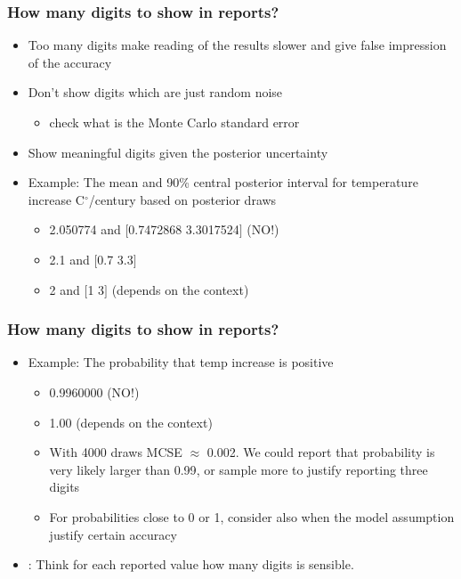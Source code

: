 \documentclass[10pt]{beamer}
\begin{document}
\begin{frame}

\frametitle{How many digits to show in reports?}


  \begin{itemize}
  \item Too many digits make reading of the results slower and give
    false impression of the accuracy
  \item<2-> Don't show digits which are just random noise
    \begin{itemize}
    \item check what is the Monte Carlo standard error
    \end{itemize}
  \item<3-> Show meaningful digits given the posterior uncertainty
  \item<4-> Example: The mean and 90\% central posterior interval for temperature
     increase C$^\circ$/century based on posterior draws
     \begin{itemize}
     \item<5-> {\color{red} 2.050774 and $[$0.7472868 3.3017524$]$} (NO!)
     \item<6-> {\color{uured} 2.1 and $[$0.7 3.3$]$}
    \item<7-> {\color{uured} 2 and $[$1 3$]$} (depends on the context)
     \end{itemize}
  \end{itemize}

\end{frame}


\begin{frame}

\frametitle{How many digits to show in reports?}


  \begin{itemize}

   \item Example: The probability that temp increase is
     positive
     \pause
     \begin{itemize}
     \item {\color{red} 0.9960000} (NO!)
     \pause
     \item {\color{uured} 1.00} (depends on the context)
     \pause
     \item With 4000 draws MCSE $\approx$ 0.002. We could report
       that probability is {\color{uured} very likely larger than 0.99}, or sample
       more to justify reporting three digits
       \pause
     \item For probabilities close to 0 or 1, consider also when
       the model assumption justify certain accuracy
     \end{itemize}
     \pause
   \item {}: Think for each reported value how many digits is sensible.
  \end{itemize}

\end{frame}
\end{document}
